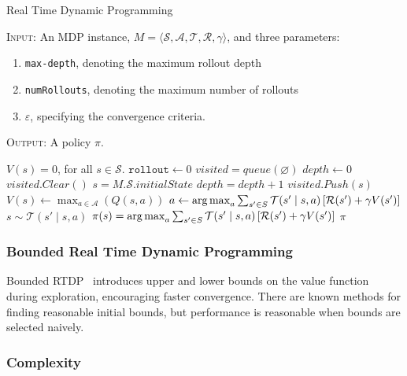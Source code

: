 \documentclass[11pt]{article}
\begin{document}
\begin{algorithm}[t]
\caption{Real Time Dynamic Programming}
\textsc{Input:} An MDP instance, $M = \langle \mathcal{S}, \mathcal{A}, \mathcal{T}, \mathcal{R}, \gamma \rangle$, and three parameters: 
\begin{enumerate}
\item \texttt{max-depth}, denoting the maximum rollout depth
\item \texttt{numRollouts}, denoting the maximum number of rollouts
\item $\varepsilon$, specifying the convergence criteria.
\end{enumerate}
\textsc{Output:} A policy $\pi$.
\begin{algorithmic}[1]
\State $V(s) = 0$, for all $s \in \mathcal{S}$.
\State $\texttt{rollout} \gets 0$
\State $visited = queue(\varnothing)$
\State $depth \gets 0$
\State $visited.Clear()$
\State $s = M.\mathcal{S}.initialState$
\State $depth = depth + 1$
\State $visited.Push(s)$
\State $V(s) \gets \max_{a \in \mathcal{A}} (Q(s,a))$
\State $a \gets \operatorname*{arg\,max}_a \sum_{s' \in S} \mathcal{T}(s' \mid s, a) \left[\mathcal{R}(s') + \gamma V(s') \right]$
\State $s \sim \mathcal{T}(s' \mid s,a)$
\EndWhile
\EndWhile
{}
\State $\pi(s) = \operatorname*{arg\,max}_a \sum_{s' \in S} \mathcal{T}(s' \mid s, a) \left[\mathcal{R}(s') + \gamma V(s') \right]$
\EndFor
{} $\pi$
\end{algorithmic}
\label{alg:rtdp}
\end{algorithm}

\subsubsection{Bounded Real Time Dynamic Programming}

Bounded RTDP~\cite{mcmahan2005bounded} introduces upper and lower bounds on the value function during exploration, encouraging faster convergence. There are known methods for finding reasonable initial bounds, but performance is reasonable when bounds are selected naively. 




\subsubsection{Complexity}
\end{document}
